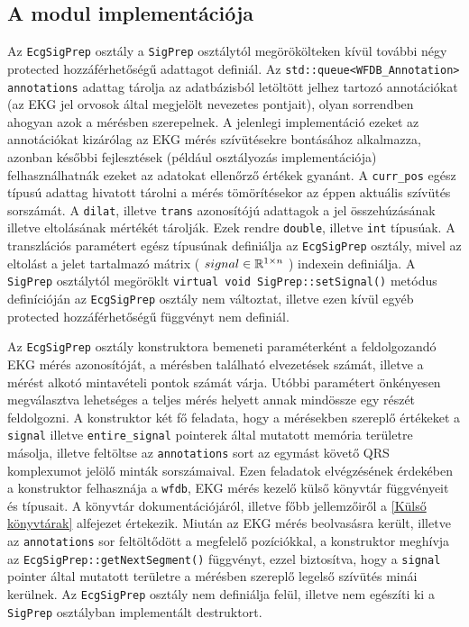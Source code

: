 \documentclass[oneside,titlepage,12pt,a4paper]{report}
\begin{document}
\subsection*{A modul implementációja}

\par Az \texttt{EcgSigPrep} osztály a \texttt{SigPrep} osztálytól megörökölteken kívül további négy protected hozzáférhetőségű adattagot definiál. Az \texttt{std::queue<WFDB\_Annotation> annotations} adattag tárolja az adatbázisból letöltött jelhez tartozó annotációkat (az EKG jel orvosok által megjelölt nevezetes pontjait), olyan sorrendben ahogyan azok a mérésben szerepelnek. A jelenlegi implementáció ezeket az annotációkat kizárólag az EKG mérés szívütésekre bontásához alkalmazza, azonban későbbi fejlesztések (például osztályozás implementációja) felhasználhatnák ezeket az adatokat ellenőrző értékek gyanánt. A \texttt{curr\_pos} egész típusú adattag hivatott tárolni a mérés tömörítésekor az éppen aktuális szívütés sorszámát. A \texttt{dilat}, illetve \texttt{trans} azonosítójú adattagok a jel összehúzásának illetve eltolásának mértékét tárolják. Ezek rendre \texttt{double}, illetve \texttt{int} típusúak. A transzlációs paramétert egész típusúnak definiálja az \texttt{EcgSigPrep} osztály, mivel az eltolást a jelet tartalmazó mátrix ( $ signal \in \Bbb R^{1 \times n} $ ) indexein definiálja. A \texttt{SigPrep} osztálytól megöröklt \texttt{virtual void SigPrep::setSignal()} metódus definícióján az \texttt{EcgSigPrep} osztály nem változtat, illetve ezen kívül egyéb protected hozzáférhetőségű függvényt nem definiál.
\par Az \texttt{EcgSigPrep} osztály konstruktora bemeneti paraméterként a feldolgozandó EKG mérés azonosítóját, a mérésben található elvezetések számát, illetve a mérést alkotó mintavételi pontok számát várja. Utóbbi paramétert önkényesen megválasztva lehetséges a teljes mérés helyett annak mindössze egy részét feldolgozni. A konstruktor két fő feladata, hogy a mérésekben szereplő értékeket a \texttt{signal} illetve \texttt{entire\_signal} pointerek által mutatott memória területre másolja, illetve feltöltse az \texttt{annotations} sort az egymást követő QRS komplexumot jelölő minták sorszámaival. Ezen feladatok elvégzésének érdekében a konstruktor felhasznája a \texttt{wfdb}, EKG mérés kezelő külső könyvtár függvényeit és típusait. A könyvtár dokumentációjáról, illetve főbb jellemzőiről a \ref{Külső könyvtárak} alfejezet értekezik. Miután az EKG mérés beolvasásra került, illetve az \texttt{annotations} sor feltöltődött a megfelelő pozíciókkal, a konstruktor meghívja az \texttt{EcgSigPrep::getNextSegment()} függvényt, ezzel biztosítva, hogy a \texttt{signal} pointer által mutatott területre a mérésben szereplő legelső szívütés minái kerülnek. Az \texttt{EcgSigPrep} osztály nem definiálja felül, illetve nem egészíti ki a \texttt{SigPrep} osztályban implementált destruktort. 
\end{document}

